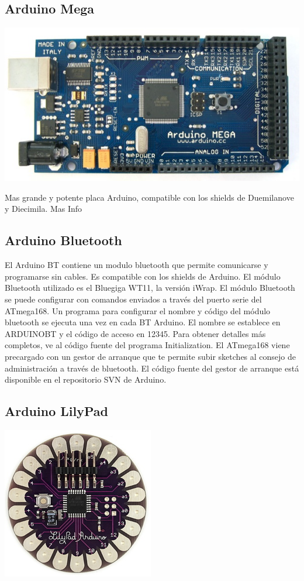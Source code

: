 \documentclass[12pt,a4paper]{report}
\begin{document}
\subsection{Arduino Mega}

\includegraphics[scale=0.6]{ArduinoMega.jpg}

Mas grande y potente placa Arduino, compatible con los shields de Duemilanove y Diecimila. Mas Info

\subsection{Arduino Bluetooth}

El Arduino BT contiene un modulo bluetooth que permite comunicarse y programarse
sin cables. Es compatible con los shields de Arduino. 
El módulo Bluetooth utilizado es el Bluegiga WT11, la versión iWrap. El módulo
Bluetooth se puede configurar con comandos enviados a través del puerto serie
del ATmega168. Un programa para configurar el nombre y código del módulo
bluetooth se ejecuta una vez en cada BT Arduino. El nombre se establece en
ARDUINOBT y el código de acceso en 12345. Para obtener detalles más completos,
ve al código fuente del programa Initialization. El ATmega168 viene precargado
con un gestor de arranque que te permite subir sketches al consejo de
administración a través de bluetooth. El código fuente del gestor de arranque
está disponible en el repositorio SVN de Arduino.

\subsection{Arduino LilyPad}

\includegraphics[scale=0.6]{LilyPad_3.jpg}
\end{document}

